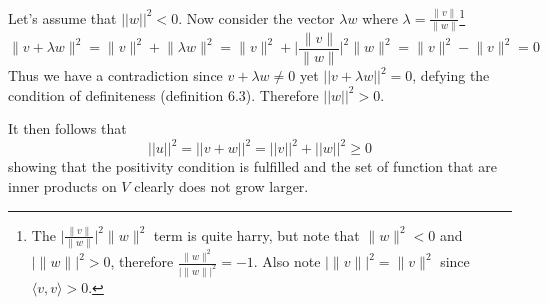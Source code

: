 \documentclass{article}
\providecommand{\abs}[1]{\lvert#1\rvert} \providecommand{\norm}[1]{\lVert#1\rVert}
\begin{document}
Let's assume that $||w||^2 < 0$. Now consider the vector $\lambda w$ where $\lambda=\frac{\norm{v}}{\norm{w}}$\footnote{The $\abs{\frac{\norm{v}}{\norm{w}}}^2 \norm{w}^2$ term is quite harry, but note that $\norm{w}^2 < 0$ and $\abs{\norm{w}}^2 > 0$, therefore $\frac{\norm{w}^2}{\abs{\norm{w}}^2} = -1 $. Also note $\abs{\norm{v}}^2 = \norm{v}^2$ since $\langle v, v\rangle > 0$.}
\[\norm{v+\lambda w}^2=\norm{v}^2+\norm{\lambda w}^2 = \norm{v}^2+\abs{\frac{\norm{v}}{\norm{w}}}^2 \norm{w}^2 = \norm{v}^2 - \norm{v}^2 = 0 \]
Thus we have a contradiction since $v+\lambda w\neq0$ yet $||v+\lambda w||^2=0$, defying the condition of definiteness (definition 6.3). Therefore $||w||^2 > 0$.

It then follows that 
\[||u||^2 = ||v+w||^2=||v||^2+||w||^2 \geq 0\]
showing that the positivity condition is fulfilled and the set of function that are inner products on $V$ clearly does not grow larger.
\end{document}
